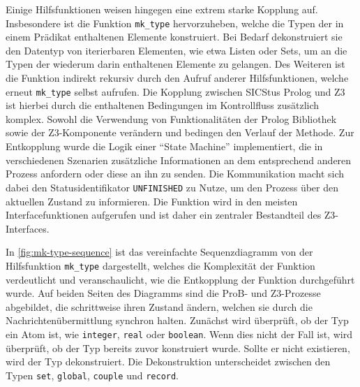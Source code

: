 Einige Hilfsfunktionen weisen hingegen eine extrem starke Kopplung auf.
Insbesondere ist die Funktion \texttt{mk\_type} hervorzuheben, welche die Typen der in einem Prädikat enthaltenen Elemente konstruiert.
Bei Bedarf dekonstruiert sie den Datentyp von iterierbaren Elementen, wie etwa Listen oder Sets, um an die Typen der wiederum darin enthaltenen Elemente zu gelangen.
Des Weiteren ist die Funktion indirekt rekursiv durch den Aufruf anderer Hilfsfunktionen, welche erneut \texttt{mk\_type} selbst aufrufen.
Die Kopplung zwischen SICStus Prolog und Z3 ist hierbei durch die enthaltenen Bedingungen im Kontrollfluss zusätzlich komplex.
Sowohl die Verwendung von Funktionalitäten der Prolog Bibliothek sowie der Z3-Komponente verändern und bedingen den Verlauf der Methode.
Zur Entkopplung wurde die Logik einer \enquote{State Machine} implementiert, die in verschiedenen Szenarien zusätzliche Informationen
an dem entsprechend anderen Prozess anfordern oder diese an ihn zu senden.
Die Kommunikation macht sich dabei den Statusidentifikator \texttt{UNFINISHED} zu Nutze, um den Prozess über den aktuellen Zustand zu informieren.
Die Funktion wird in den meisten Interfacefunktionen aufgerufen und ist daher ein zentraler Bestandteil des Z3-Interfaces.

In \cref{fig:mk-type-sequence} ist das vereinfachte Sequenzdiagramm von der Hilfsfunktion \texttt{mk\_type} dargestellt, welches die Komplexität der Funktion verdeutlicht
und veranschaulicht, wie die Entkopplung der Funktion durchgeführt wurde.
Auf beiden Seiten des Diagramms sind die ProB- und Z3-Prozesse abgebildet, die schrittweise ihren Zustand ändern, welchen sie durch die Nachrichtenübermittlung synchron halten.
Zunächst wird überprüft, ob der Typ ein Atom ist, wie \texttt{integer}, \texttt{real} oder \texttt{boolean}.
Wenn dies nicht der Fall ist, wird überprüft, ob der Typ bereits zuvor konstruiert wurde.
Sollte er nicht existieren, wird der Typ dekonstruiert. Die Dekonstruktion unterscheidet zwischen den Typen \texttt{set}, \texttt{global}, \texttt{couple} und \texttt{record}.

